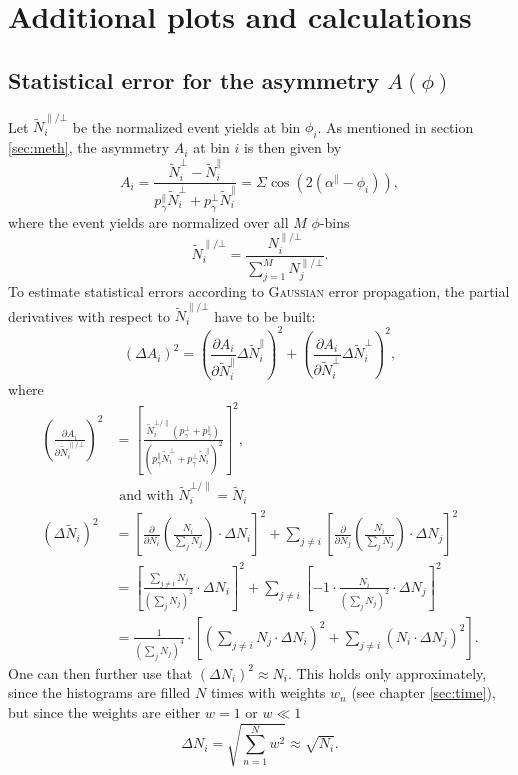 \chapter{Additional plots and calculations}
\label{sec:app}
\section{Statistical error for the asymmetry $A(\phi)$}
\label{sec:stat_err}
Let $\tilde{N}^{\parallel/\bot}_i$ be the normalized event yields at bin $\phi_i$. As mentioned in section \ref{sec:meth}, the asymmetry $A_i$ at bin $i$ is then given by
\begin{equation}
	A_i=\frac{\tilde{N}^\bot_i-\tilde{N}^\parallel_i}{p_\gamma^\parallel\tilde{N}^\bot_i+p_\gamma^\bot\tilde{N}^\parallel_i}=\Sigma\cos\left(2\left(\alpha^\parallel-\phi_i\right)\right),
	\label{eq:evyieldasym_app}
\end{equation}
where the event yields are normalized over all $M$ $\phi$-bins $$\tilde{N}^{\parallel/\bot}_i=\frac{N_i^{\parallel/\bot}}{\sum_{j=1}^{M}N_j^{\parallel/\bot}}.$$
 To estimate statistical errors according to \textsc{Gaussian} error propagation, the partial derivatives with respect to $\tilde{N}_i^{\parallel/\bot}$ have to be built:
 \begin{equation}
 	\left(\Delta A_i\right)^2=\left(\frac{\partial A_i}{\partial \tilde{N}^\parallel_i}\Delta \tilde{N}^\parallel_i\right)^2+\left(\frac{\partial A_i}{\partial \tilde{N}^\bot_i}\Delta \tilde{N}^\bot_i\right)^2,
 \end{equation}
where
\begin{align}
	\left(\frac{\partial A_i}{\partial \tilde{N}^{\parallel/\bot}_i}\right)^2&=\left[\frac{\tilde{N}^{\bot/\parallel}_i\left(p_\gamma^\bot+p_\gamma^\parallel\right)}{\left(p_\gamma^\parallel\tilde{N}^{\bot}_i+p_\gamma^\bot\tilde{N}^\parallel_i\right)^2}\right]^2,\\
	&\text{ and with } \tilde{N}_i^{\bot/\parallel}=\tilde{N}_i\\
	\left(\Delta\tilde{N}_i\right)^2&=\left[\frac{\partial}{\partial N_i}\left(\frac{N_i}{\sum_{j}N_j}\right)\cdot\Delta N_i\right]^2+\sum_{j\neq i}\left[\frac{\partial}{\partial N_j}\left(\frac{N_i}{\sum_{j}N_j}\right)\cdot\Delta N_j\right]^2\\
	&=\left[\frac{\sum_{j\neq i} N_j}{\left(\sum_{j} N_j\right)^2}\cdot\Delta N_i\right]^2+\sum_{j\neq i}\left[-1\cdot\frac{N_i}{\left(\sum_{j}N_j\right)^2}\cdot\Delta N_j\right]^2\\
	&=\frac{1}{\left(\sum_{j} N_j\right)^4}\cdot\left[\left(\sum_{j\neq i} N_j \cdot\Delta N_i\right)^2+\sum_{j\neq i}\left(N_i\cdot\Delta N_j\right)^2\right].
\end{align}
One can then further use that $\left(\Delta N_i\right)^2  \approx N_i$. This holds only approximately, since the histograms are filled $N$ times with weights $w_n$ (see chapter \ref{sec:time}), but since the weights are either $w=1$ or $w\ll1$
\begin{equation}
	\Delta N_i=\sqrt{\sum_{n=1}^N w^2}\approx\sqrt{N_i}.
\end{equation}
